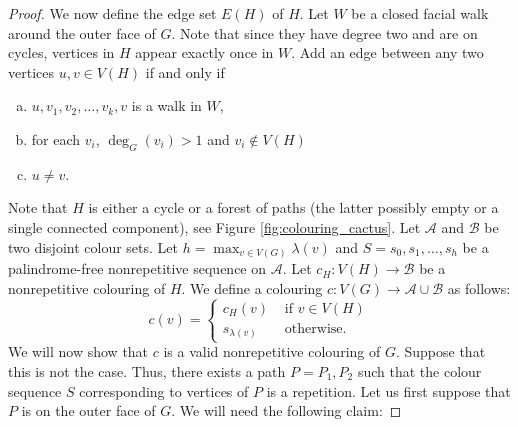 \documentclass{patmorin}
\begin{document}
\begin{proof}
 
 We now define the edge set $E(H)$ of $H$. Let $W$ be a closed facial walk around the outer face of $G$. Note that since they have degree two and are on cycles, vertices in $H$ appear exactly once in $W$. Add an edge between any two vertices $u,v \in V(H)$ if and only if 
 \begin{enumerate}[a)]
  \item $u,v_1,v_2,\ldots,v_k,v$ is a walk in $W$,
  \item for each $v_i$, $\deg_G(v_i) > 1$ and $v_i \notin V(H)$
  \item $u\not=v$.
 \end{enumerate}
 Note that $H$ is either a cycle or a forest of paths (the latter possibly empty or a single connected component), see Figure \ref{fig:colouring_cactus}. Let $\mathcal{A}$ and $\mathcal{B}$ be two disjoint colour sets. Let $h=\max_{v \in V(G)} \lambda(v)$ and $S=s_0,s_1,\ldots,s_h$ be a palindrome-free nonrepetitive sequence on $\mathcal{A}$. Let $c_H : V(H) \rightarrow \mathcal{B}$ be a nonrepetitive colouring of $H$. We define a colouring $c : V(G) \rightarrow \mathcal{A} \cup \mathcal{B}$ as follows:
 \begin{equation}
  c(v) = \begin{cases}
          c_H(v) & \text{ if } v \in V(H)\\
          s_{\lambda(v)} & \text{ otherwise.}
         \end{cases}
 \end{equation}
 We will now show that $c$ is a valid nonrepetitive colouring of $G$. Suppose that this is not the case. Thus, there exists a path $P=P_1,P_2$ such that the colour sequence $S$ corresponding to vertices of $P$ is a repetition. Let us first suppose that $P$ is on the outer face of $G$. We will need the following claim:
 

\end{proof}
\end{document}
